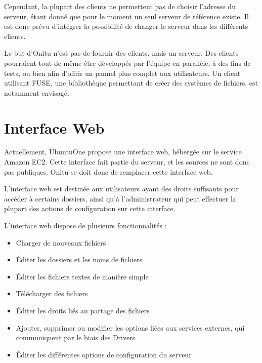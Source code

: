 Cependant, la plupart des clients ne permettent pas de choisir l'adresse du serveur, étant donné que pour le moment un seul serveur de référence existe. Il est donc prévu d'intégrer la possibilité de changer le serveur dans les différents clients.

Le but d'Onitu n'est pas de fournir des clients, mais un serveur. Des clients pourraient tout de même être développés par l'équipe en parallèle, à des fins de tests, ou bien afin d'offrir un pannel plus complet aux utilisateurs. Un client utilisant FUSE, une bibliothèque permettant de créer des systèmes de fichiers, est notamment envisagé.

\section{Interface Web}
Actuellement, UbuntuOne propose une interface web, hébergée sur le service Amazon EC2. Cette interface fait partie du serveur, et les sources ne sont donc pas publiques.
Onitu se doit donc de remplacer cette interface web.

L'interface web est destinée aux utilisateurs ayant des droits suffisants pour accéder à certains dossiers, ainsi qu'à l'administrateur qui peut effectuer la plupart des actions de configuration sur cette interface.

L'interface web dispose de plusieurs fonctionnalités :
\begin{itemize}
    \item Charger de nouveaux fichiers
    \item Éditer les dossiers et les noms de fichiers
    \item Éditer les fichiers textes de manière simple
    \item Télécharger des fichiers
    \item Éditer les droits liés au partage des fichiers
    \item Ajouter, supprimer ou modifier les options liées aux services externes, qui communiquent par le biais des Drivers
    \item Éditer les différentes options de configuration du serveur
\end{itemize}